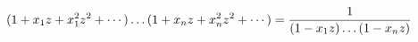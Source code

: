 $$
(1+x_1z+x_1^2z^2 + \cdots\,)\ldots(1+x_nz + x_n^2z^2 + \cdots\,)
=
{1 \over (1 - x_1z)\ldots(1 - x_nz)}
$$

\bye

